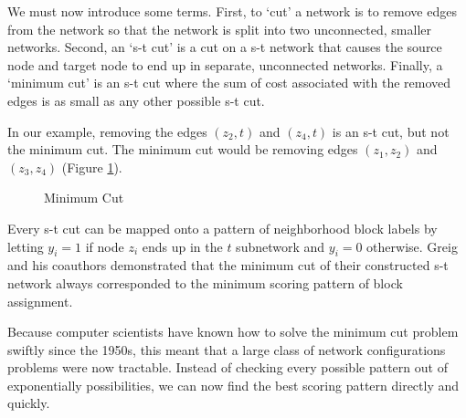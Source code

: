 We must now introduce some terms. First, to `cut' a network is to
remove edges from the network so that the network is split into two
unconnected, smaller networks. Second, an `s-t cut' is a cut on a s-t
network that causes the source node and target node to end up in
separate, unconnected networks. Finally, a `minimum cut' is an s-t cut
where the sum of cost associated with the removed edges is as small as
any other possible s-t cut. 

In our example, removing the edges $(z_2, t)$ and $(z_4, t)$ is an s-t
cut, but not the minimum cut. The minimum cut would be removing edges
$(z_1, z_2)$ and $(z_3, z_4)$ (Figure \ref{fig:mincut}).

\begin{figure}[!h]
\centering

\caption{Minimum Cut}
\label{fig:mincut}
\end{figure}

Every s-t cut can be mapped onto a pattern of neighborhood block
labels by letting $y_i = 1$ if node $z_i$ ends up in the $t$
subnetwork and $y_i = 0$ otherwise. Greig and his coauthors
demonstrated that the minimum cut of their constructed s-t network
always corresponded to the minimum scoring pattern of block
assignment.

Because computer scientists have known how to solve the minimum cut
problem swiftly since the 1950s, this meant that a large class of
network configurations problems were now tractable. Instead of
checking every possible pattern out of exponentially possibilities, we
can now find the best scoring pattern directly and
quickly.\cite{ford_maximal_1956}

